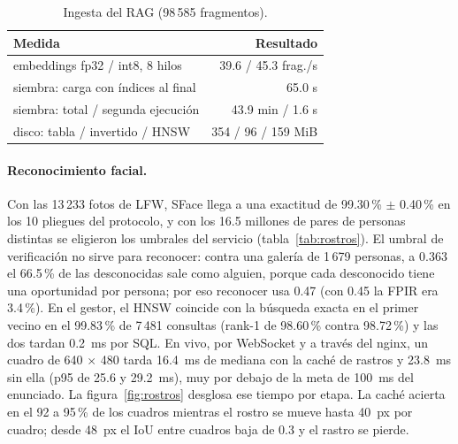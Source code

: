 \begin{table}[!htb]
\begin{minipage}[t]{0.55\textwidth}
\vspace{6pt}
\caption{Ingesta del RAG (98\,585 fragmentos).}\label{tab:rag}
\small
\begin{tabular}{@{}L{5.6cm}r@{}}
\toprule
\textbf{Medida} & \textbf{Resultado} \\
\midrule
embeddings fp32 / int8, 8 hilos & 39.6 / 45.3 frag./s \\
siembra: carga con índices al final & 65.0 s \\
siembra: total / segunda ejecución & 43.9 min / 1.6 s \\
disco: tabla / invertido / HNSW & 354 / 96 / 159 MiB \\
\bottomrule
\end{tabular}
\end{minipage}
\end{table}

\paragraph{Reconocimiento facial.} Con las 13\,233 fotos de LFW, SFace llega a una
exactitud de 99.30\,\% $\pm$ 0.40\,\% en los 10 pliegues del protocolo, y con los 16.5
millones de pares de personas distintas se eligieron los umbrales del servicio
(tabla~\ref{tab:rostros}). El umbral de verificación no sirve para reconocer: contra una
galería de 1\,679 personas, a 0.363 el 66.5\,\% de las desconocidas sale como alguien,
porque cada desconocido tiene una oportunidad por persona; por eso reconocer usa 0.47 (con 0.45 la FPIR era 3.4\,\%). En
el gestor, el HNSW coincide con la búsqueda exacta en el primer vecino en el 99.83\,\% de
7\,481 consultas (rank-1 de 98.60\,\% contra 98.72\,\%) y las dos tardan 0.2~ms por SQL. En
vivo, por WebSocket y a través del nginx, un cuadro de 640 $\times$ 480 tarda 16.4~ms de
mediana con la caché de rastros y 23.8~ms sin ella (p95 de 25.6 y 29.2~ms), muy por debajo
de la meta de 100~ms del enunciado. La figura~\ref{fig:rostros} desglosa ese tiempo por etapa. La caché acierta en el 92 a 95\,\% de los cuadros
mientras el rostro se mueve hasta 40~px por cuadro; desde 48~px el IoU entre cuadros baja
de 0.3 y el rastro se pierde.

